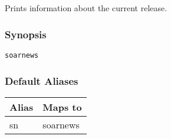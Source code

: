\subsection{}
\label{soarnews}
Prints information about the current release. 
\subsubsection*{Synopsis}
\begin{verbatim}
soarnews
\end{verbatim}
\subsubsection*{Default Aliases}
\begin{tabular}{|l|l|}
\hline 
 Alias  & Maps to  \\
 \hline 
 sn  & soarnews  \\
 \hline 
\end{tabular}

